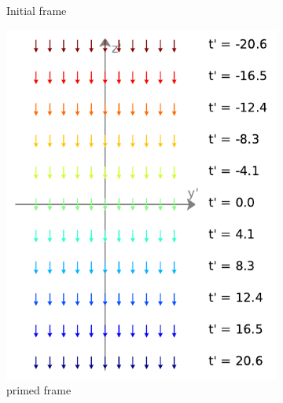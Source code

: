 \begin{figure}[H]
\begin{subfigure}{0.29\textwidth}
		\caption{Initial frame}
		\label{fig: coordinate transform subfig_1}
	\end{subfigure}
	\begin{subfigure}{0.32\textwidth}
		\centering
		\includegraphics[width=\textwidth]{images/pdf/coord_transform_primed.pdf}
		\caption{primed frame}
		\label{fig: coordinate transform subfig_2}
	\end{subfigure}
	\begin{subfigure}{0.29\textwidth}
		\centering

\end{subfigure}
\end{figure}
